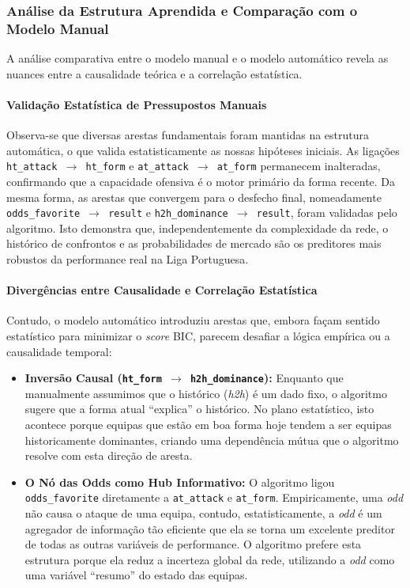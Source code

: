 \documentclass[10pt]{article}
\begin{document}
\subsubsection{Análise da Estrutura Aprendida e Comparação com o Modelo Manual}

A análise comparativa entre o modelo manual e o modelo automático revela as nuances entre a causalidade teórica e a correlação estatística. 

\paragraph{Validação Estatística de Pressupostos Manuais}
Observa-se que diversas arestas fundamentais foram mantidas na estrutura automática, o que valida estatisticamente as nossas hipóteses iniciais. As ligações \texttt{ht\_attack $\rightarrow$ ht\_form} e \texttt{at\_attack $\rightarrow$ at\_form} permanecem inalteradas, confirmando que a capacidade ofensiva é o motor primário da forma recente. Da mesma forma, as arestas que convergem para o desfecho final, nomeadamente \texttt{odds\_favorite $\rightarrow$ result} e \texttt{h2h\_dominance $\rightarrow$ result}, foram validadas pelo algoritmo. Isto demonstra que, independentemente da complexidade da rede, o histórico de confrontos e as probabilidades de mercado são os preditores mais robustos da performance real na Liga Portuguesa.

\paragraph{Divergências entre Causalidade e Correlação Estatística}
Contudo, o modelo automático introduziu arestas que, embora façam sentido estatístico para minimizar o \textit{score} BIC, parecem desafiar a lógica empírica ou a causalidade temporal:
\begin{itemize}
    \item \textbf{Inversão Causal (\texttt{ht\_form $\rightarrow$ h2h\_dominance}):} Enquanto que manualmente assumimos que o histórico (\textit{h2h}) é um dado fixo, o algoritmo sugere que a forma atual ``explica'' o histórico. No plano estatístico, isto acontece porque equipas que estão em boa forma hoje tendem a ser equipas historicamente dominantes, criando uma dependência mútua que o algoritmo resolve com esta direção de aresta.
    \item \textbf{O Nó das Odds como Hub Informativo:} O algoritmo ligou \texttt{odds\_favorite} diretamente a \texttt{at\_attack} e \texttt{at\_form}. Empiricamente, uma \textit{odd} não causa o ataque de uma equipa, contudo, estatisticamente, a \textit{odd} é um agregador de informação tão eficiente que ela se torna um excelente preditor de todas as outras variáveis de performance. O algoritmo prefere esta estrutura porque ela reduz a incerteza global da rede, utilizando a \textit{odd} como uma variável ``resumo'' do estado das equipas.
\end{itemize}
\end{document}
